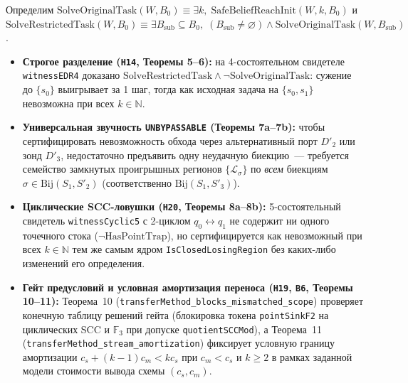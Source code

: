 \documentclass[10pt,a4paper]{article}
\newcommand{\code}[1]{\nolinkurl{#1}}
\begin{document}
Определим $\mathrm{SolveOriginalTask}(W, B_0) \equiv \exists k,\; \mathrm{SafeBeliefReachInit}(W, k, B_0)$ и $\mathrm{SolveRestrictedTask}(W, B_0) \equiv \exists B_{\mathrm{sub}} \subseteq B_0,\; (B_{\mathrm{sub}} \ne \varnothing) \land \mathrm{SolveOriginalTask}(W, B_{\mathrm{sub}})$.
\begin{itemize}
\item \textbf{Строгое разделение (\code{H14}, Теоремы 5--6):} на 4-состоятельном свидетеле \code{witnessEDR4} доказано $\mathrm{SolveRestrictedTask} \land \neg\mathrm{SolveOriginalTask}$: сужение до $\{s_0\}$ выигрывает за 1 шаг, тогда как исходная задача на $\{s_0, s_1\}$ невозможна при всех $k \in \mathbb{N}$.
\item \textbf{Универсальная звучность \code{UNBYPASSABLE} (Теоремы 7a--7b):} чтобы сертифицировать невозможность обхода через альтернативный порт $D'_2$ или зонд $D'_3$, недостаточно предъявить одну неудачную биекцию~--- требуется семейство замкнутых проигрышных регионов $\{\mathcal{L}_\sigma\}$ по \emph{всем} биекциям $\sigma \in \mathrm{Bij}(S_1, S'_2)$ (соответственно $\mathrm{Bij}(S_1, S'_3)$).
\item \textbf{Циклические SCC-ловушки (\code{H20}, Теоремы 8a--8b):} 5-состоятельный свидетель \code{witnessCyclic5} с 2-циклом $q_0 \leftrightarrow q_1$ не содержит ни одного точечного стока ($\neg\mathrm{HasPointTrap}$), но сертифицируется как невозможный при всех $k \in \mathbb{N}$ тем же самым ядром \code{IsClosedLosingRegion} без каких-либо изменений его определения.
\item \textbf{Гейт предусловий и условная амортизация переноса (\code{H19}, \code{B6}, Теоремы 10--11):} Теорема~10 (\code{transferMethod_blocks_mismatched_scope}) проверяет конечную таблицу решений гейта (блокировка токена \code{pointSinkF2} на циклических SCC и $\mathbb{F}_3$ при допуске \code{quotientSCCMod}), а Теорема~11 (\code{transferMethod_stream_amortization}) фиксирует условную границу амортизации $c_s + (k-1)c_m < k c_s$ при $c_m < c_s$ и $k \ge 2$ в рамках заданной модели стоимости вывода схемы $(c_s, c_m)$.
\end{itemize}
\end{document}
